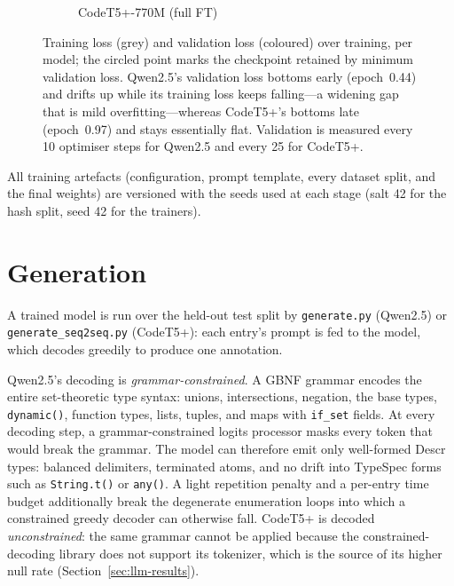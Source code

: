 \begin{figure}[H]
\begin{subfigure}[t]{0.49\textwidth}
\caption{CodeT5+-770M (full FT)}
\end{subfigure}
\caption[Learning and validation curves for the two runs.]{Training loss (grey) and validation loss (coloured) over training, per model; the circled point marks the checkpoint retained by minimum validation loss. Qwen2.5's validation loss bottoms early (epoch~\num{0.44}) and drifts up while its training loss keeps falling---a widening gap that is mild overfitting---whereas CodeT5+'s bottoms late (epoch~\num{0.97}) and stays essentially flat. Validation is measured every 10 optimiser steps for Qwen2.5 and every 25 for CodeT5+.}
\label{fig:llm-loss-curves}
\end{figure}

All training artefacts (configuration, prompt template, every dataset split, and the final weights) are versioned with the seeds used at each stage (salt 42 for the hash split, seed 42 for the trainers).

\section{Generation}
\label{sec:llm-generation}
A trained model is run over the held-out test split by \texttt{generate.py} (Qwen2.5) or \texttt{generate\_seq2seq.py} (CodeT5+): each entry's prompt is fed to the model, which decodes greedily to produce one annotation.

Qwen2.5's decoding is \emph{grammar-constrained}.
A GBNF grammar encodes the entire set-theoretic type syntax: unions, intersections, negation, the base types, \texttt{dynamic()}, function types, lists, tuples, and maps with \texttt{if\_set} fields. At every decoding step, a grammar-constrained logits processor masks every token that would break the grammar.
The model can therefore emit only well-formed Descr types: balanced delimiters, terminated atoms, and no drift into TypeSpec forms such as \texttt{String.t()} or \texttt{any()}.
A light repetition penalty and a per-entry time budget additionally break the degenerate enumeration loops into which a constrained greedy decoder can otherwise fall.
CodeT5+ is decoded \emph{unconstrained}: the same grammar cannot be applied because the constrained-decoding library does not support its tokenizer, which is the source of its higher null rate (Section~\ref{sec:llm-results}).

